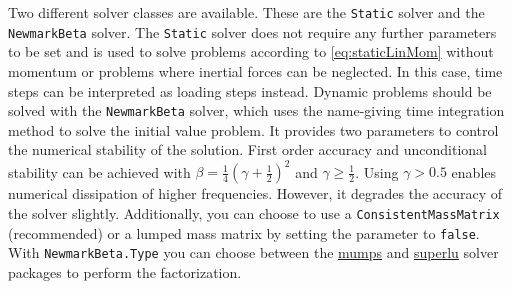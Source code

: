 Two different solver classes are available.
These are the \verb|Static| solver and the \verb|NewmarkBeta| solver.
The \verb|Static| solver does not require any further parameters to be set and is used to solve problems according to \autoref{eq:staticLinMom} without momentum or problems where inertial forces can be neglected.
In this case, time steps can be interpreted as loading steps instead.
Dynamic problems should be solved with the \verb|NewmarkBeta| solver, which uses the name-giving time integration method to solve the initial value problem.
It provides two parameters to control the numerical stability of the solution.
First order accuracy and unconditional stability can be achieved with $\beta = \frac{1}{4}(\gamma + \frac{1}{2})^2$ and $\gamma \geq \frac{1}{2}$.
Using $\gamma > 0.5$ enables numerical dissipation of higher frequencies.
However, it degrades the accuracy of the solver slightly.
Additionally, you can choose to use a \verb|ConsistentMassMatrix| (recommended) or a lumped mass matrix by setting the parameter to \verb|false|.
With \verb|NewmarkBeta.Type| you can choose between the \href{https://petsc.org/main/manualpages/Mat/MATSOLVERMUMPS/}{mumps} and \href{https://petsc.org/main/manualpages/Mat/MATSOLVERSUPERLU/}{superlu} solver packages to perform the factorization.

